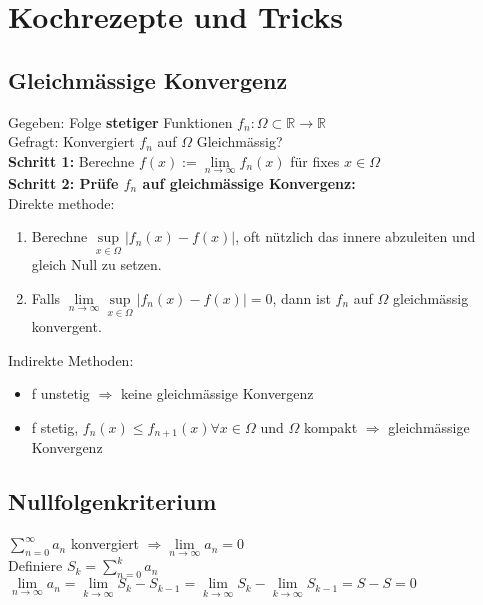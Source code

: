\documentclass[a4paper,10pt]{article}
\def\limn{\lim\limits_{n\to \infty}}
\def\sumn{\sum\limits_{n=0}^{\infty}}
\def\R{\mathbb{R}}
\begin{document}
\section{Kochrezepte und Tricks}
\subsection{Gleichmässige	Konvergenz}
\begin{subbox}{}
  Gegeben: Folge \textbf{stetiger} Funktionen $f_n : \Omega \subset \R \to \R$\\
  Gefragt: Konvergiert $f_n$ auf $\Omega$ Gleichmässig?\\
  \textbf{Schritt 1:} Berechne $f(x) := \limn f_n(x)$ für fixes $x \in \Omega$\\
  \textbf{Schritt 2: Prüfe $f_n$ auf gleichmässige Konvergenz:}\\
  Direkte methode:
  \begin{enumerate}
    \item Berechne $\underset{x\in\Omega}{\sup} |f_n(x) - f(x)|$, oft nützlich das innere abzuleiten und gleich Null zu setzen.
    \item Falls $\limn \underset{x\in\Omega}{\sup} |f_n(x) - f(x)| = 0$, dann ist $f_n$ auf $\Omega$ gleichmässig konvergent.
  \end{enumerate} 

  Indirekte Methoden:
  \begin{itemize}
    \item f unstetig $\Rightarrow$ keine gleichmässige Konvergenz
    \item f stetig, $f_n(x) \leq f_{n+1}(x) \forall x \in \Omega$ und $\Omega$ kompakt $\Rightarrow$ gleichmässige Konvergenz
  \end{itemize}
\end{subbox}

\subsection{Nullfolgenkriterium}
\begin{subbox}{}
  $\sumn a_n$ konvergiert $\Rightarrow \limn a_n = 0$\\
  Definiere $S_k = \sum\limits_{n=0}^{k} a_n$\\
  $\limn a_n = \lim\limits_{k\to \infty} S_k - S_{k-1} = \lim\limits_{k\to \infty} S_k - \lim\limits_{k\to \infty} S_{k-1} = S - S = 0$
\end{subbox}
\end{document}
